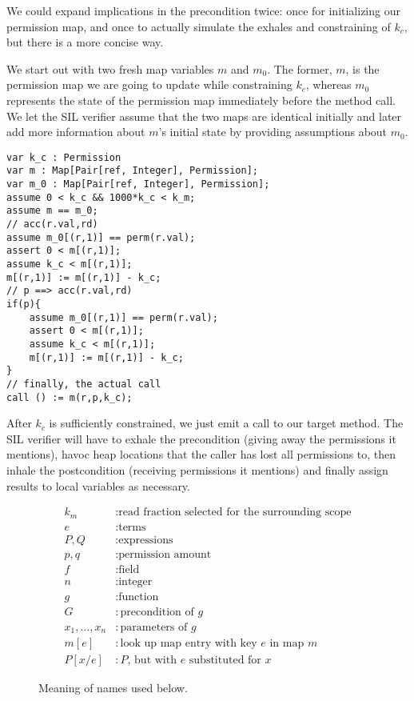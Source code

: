 We could expand implications in the precondition twice: once for initializing our permission map, and once to actually simulate the exhales and constraining of $k_c$, but there is a more concise way.

We start out with two fresh map variables $m$ and $m_0$. The former, $m$, is the permission map we are going to update while constraining $k_c$, whereas $m_0$ represents the state of the permission map immediately before the method call. 
We let the SIL verifier assume that the two maps are identical initially and later add more information about $m$'s initial state by providing assumptions about $m_0$.

\begin{lstlisting}[language=sil,float,caption={Translation sketch for a method call involving fractional read permissions and the precondition \lstinline:acc(r.val,rd) && p ==> acc(r.val):},label=lst:rdcall]
var k_c : Permission
var m : Map[Pair[ref, Integer], Permission];
var m_0 : Map[Pair[ref, Integer], Permission];
assume 0 < k_c && 1000*k_c < k_m;
assume m == m_0;
// acc(r.val,rd)
assume m_0[(r,1)] == perm(r.val);
assert 0 < m[(r,1)];
assume k_c < m[(r,1)];
m[(r,1)] := m[(r,1)] - k_c;
// p ==> acc(r.val,rd)
if(p){
	assume m_0[(r,1)] == perm(r.val);
	assert 0 < m[(r,1)];
	assume k_c < m[(r,1)];
	m[(r,1)] := m[(r,1)] - k_c;
}
// finally, the actual call
call () := m(r,p,k_c);
\end{lstlisting}

After $k_c$ is sufficiently constrained, we just emit a call to our target method. 
The SIL verifier will have to 
	exhale the precondition (giving away the permissions it mentions), 
	havoc heap locations that the caller has lost all permissions to, 
	then inhale the postcondition (receiving permissions it mentions) 
	and finally assign results to local variables as necessary.

\begin{figure}
\begin{align*}
	k_m &: \text{read fraction selected for the surrounding scope} \\
	e &: \text{terms} \\
	P,Q &: \text{expressions} \\
	p,q 	&: \text{permission amount} \\
	f 	&: \text{field} \\
	n 	&: \text{integer} \\
	g 	&: \text{function} \\
	G 	&: \text{precondition of $g$} \\
	x_1,\dotsc,x_n &: \text{parameters of $g$} \\
	m[e] &: \text{look up map entry with key $e$ in map $m$} \\
	P[x/e] &: \text{$P$, but with $e$ substituted for $x$}
\end{align*}
\caption{Meaning of names used below.}
\end{figure}

